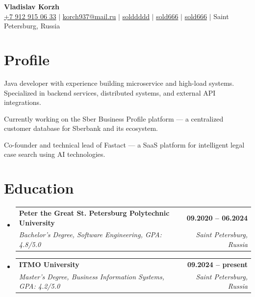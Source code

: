 \documentclass[a4paper,9pt]{report}
\makeatletter
\newcommand{\resumeSubheading}[4]{
    \vspace{-2pt}\item
    \begin{tabular*}{1.0\textwidth}[t]{l@{\extracolsep{\fill}}r}
        \textbf{\normalsize#1} & \textbf{\small #2} \\
        \textit{\normalsize#3} & \textit{\small #4} \\

    \end{tabular*}\vspace{-7pt}
}
\newcommand{\resumeSubHeadingListStart}{\begin{itemize}[leftmargin=0.0in, label={}]}
\newcommand{\resumeSubHeadingListEnd}{\end{itemize}}
\makeatother
\begin{document}
\begin{center}
    \textbf{\huge Vladislav Korzh} \\ \vspace{5pt}
    \small
    \textcolor{NavyBlue}{\faMobile} \hspace{.5pt} \href{tel:+79129150633}{+7 912 915 06 33}
    $|$
    \textcolor{NavyBlue}{\faAt} \hspace{.5pt} \href{mailto:korch937@mail.ru}{korch937@mail.ru}
    $|$
    \textcolor{NavyBlue}{\faTelegram} \hspace{.5pt} \href{https://t.me/solddddd}{solddddd}
    $|$
    \textcolor{NavyBlue}{\faLinkedin} \hspace{.5pt} \href{https://www.linkedin.com/in/sold666/}{sold666}
    $|$
    \textcolor{NavyBlue}{\faGithub} \hspace{.5pt} \href{https://github.com/sold666}{sold666}
    $|$
    \textcolor{NavyBlue}{\faMapMarker} \hspace{.5pt} {Saint Petersburg, Russia}
\end{center}

\section{Profile}

Java developer with experience building microservice and high-load systems.
Specialized in backend services, distributed systems, and external API integrations.

Currently working on the Sber Business Profile platform — a centralized customer database for Sberbank and its ecosystem.

Co-founder and technical lead of Fastact — a SaaS platform for intelligent legal case search using AI technologies.

\section{Education}

\resumeSubHeadingListStart

\resumeSubheading
{Peter the Great St. Petersburg Polytechnic University}{09.2020 -- 06.2024}
{Bachelor's Degree, Software Engineering, GPA: 4.8/5.0}{Saint Petersburg, Russia}

\resumeSubheading
{ITMO University}{09.2024 -- present}
{Master's Degree, Business Information Systems, GPA: 4.2/5.0}{Saint Petersburg, Russia}

\resumeSubHeadingListEnd
\end{document}
